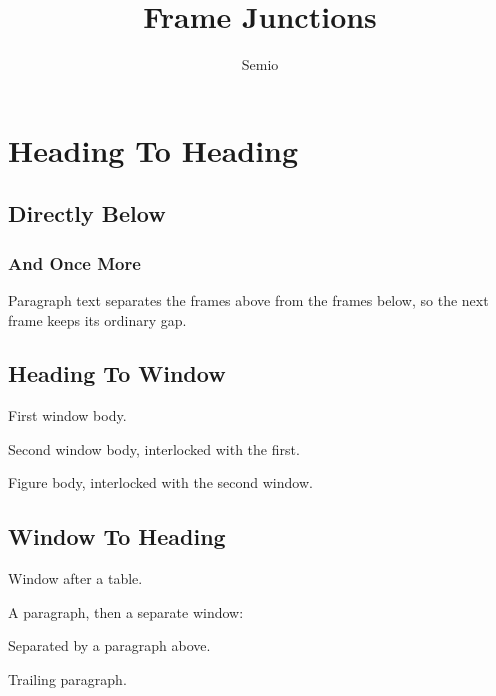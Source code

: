 \documentclass[type=report,theme=light,language=en]{semio}
\title{Frame Junctions}
\author{Semio}
\date{}
\begin{document}
\section{Heading To Heading}
\subsection{Directly Below}
\subsubsection{And Once More}
Paragraph text separates the frames above from the frames below, so the next frame keeps its ordinary gap.
\subsection{Heading To Window}
\begin{Window}[title={First Window}]
First window body.
\end{Window}
\begin{Window}[title={Second Window}]
Second window body, interlocked with the first.
\end{Window}
\begin{Figure}[title={A Figure}]
Figure body, interlocked with the second window.
\end{Figure}
\subsection{Window To Heading}
\begin{Window}[title={After Table}]
Window after a table.
\end{Window}

A paragraph, then a separate window:

\begin{Window}[title={Separate}]
Separated by a paragraph above.
\end{Window}
Trailing paragraph.
\end{document}
